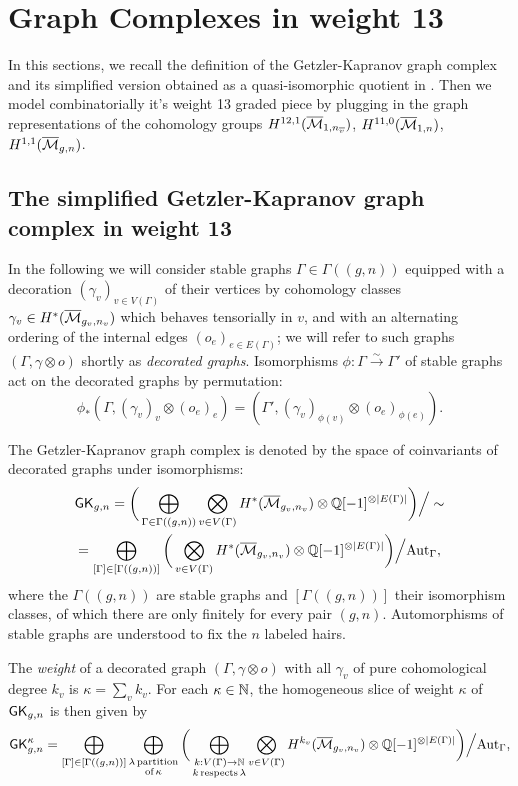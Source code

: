 

\section{Graph Complexes in weight 13}

In this sections, we recall the definition of the Getzler-Kapranov graph complex and its simplified version obtained as a quasi-isomorphic quotient in \cite{CLPW2}. Then we model combinatorially it's weight 13 graded piece by plugging in the graph representations of the cohomology groups $H^{12,1}(\overline{\mathcal{M}}_{1,n_{\overline{v}}})$, $H^{11,0}(\overline{\mathcal{M}}_{1,n})$, $H^{1,1}(\overline{\mathcal{M}}_{g,n})$.

\subsection{The simplified Getzler-Kapranov graph complex in weight 13}
In the following we will consider stable graphs $\Gamma\in\Gamma((g,n))$ equipped with a decoration $(\gamma_v)_{v\in V(\Gamma)}$ of their vertices by cohomology classes $\gamma_v \in H^{*}(\overline{\mathcal{M}}_{g_v,n_v})$ which behaves tensorially in $v$, and with an alternating ordering of the internal edges $(o_e)_{e\in E(\Gamma)}$; we will refer to such graphs $(\Gamma,\gamma\otimes o)$ shortly as \emph{decorated graphs}. Isomorphisms $\phi:\Gamma\xrightarrow{\sim}\Gamma'$ of stable graphs act on the decorated graphs by permutation:
\[ \phi_* (\Gamma,(\gamma_v)_{v}\otimes (o_e)_{e}) = (\Gamma',(\gamma_v)_{\phi(v)}\otimes (o_e)_{\phi(e)}). \]

The Getzler-Kapranov graph complex is denoted by the space of coinvariants of decorated graphs under isomorphisms:
\begin{multline}\label{equ:GKdef}
    \mathsf{GK}_{g,n} = 
    \bigg( \bigoplus_{\Gamma\in\Gamma((g,n))} \bigotimes_{v\in V(\Gamma)}H^{*}(\overline{\mathcal{M}}_{g_v,n_v})\otimes \mathbb{Q}[-1]^{\otimes |E(\Gamma)|} \bigg) \Big/ \sim \\
    = \bigoplus_{[\Gamma]\in[\Gamma((g,n))]} \bigg(
    \bigotimes_{v\in V(\Gamma)}H^{*}(\overline{\mathcal{M}}_{g_v,n_v})\otimes \mathbb{Q}[-1]^{\otimes |E(\Gamma)|} \bigg) \Big/ \text{Aut}_{\Gamma},
\end{multline}
where the $\Gamma((g,n))$ are stable graphs and $[\Gamma((g,n))]$ their isomorphism classes, of which there are only finitely for every pair $(g,n)$. Automorphisms of stable graphs are understood to fix the $n$ labeled hairs.

The \emph{weight} of a decorated graph $(\Gamma,\gamma\otimes o)$ with all $\gamma_v$ of pure cohomological degree $k_v$ is $\kappa=\sum_v k_v$. For each $\kappa\in\mathbb{N}$, the homogeneous slice of weight $\kappa$ of $\mathsf{GK}_{g,n}$ is then given by 
\begin{equation}\label{equ:GKweight}
    \mathsf{GK}^{\kappa}_{g,n} 
    = \bigoplus_{[\Gamma]\in[\Gamma((g,n))]} \bigoplus_{\substack{\lambda\,\text{partition} \\ \text{of}\,\kappa}} \bigg( \bigoplus_{\substack{k:V(\Gamma)\rightarrow \mathbb{N} \\ k\,\text{respects}\,\lambda}}
    \bigotimes_{v\in V(\Gamma)}H^{k_v}(\overline{\mathcal{M}}_{g_v,n_v})\otimes \mathbb{Q}[-1]^{\otimes |E(\Gamma)|} \bigg) \Big/ \text{Aut}_{\Gamma},
\end{equation}

